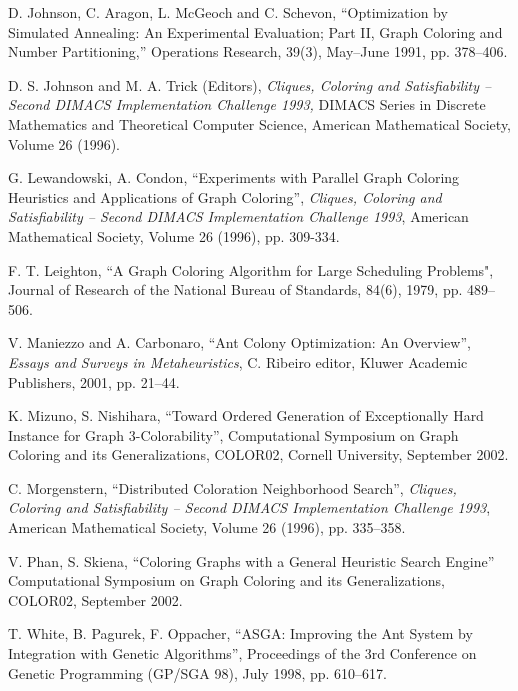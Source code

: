 \documentclass[11pt]{article}
\begin{document}
\begin{thebibliography}{99}
D. Johnson, C. Aragon, L. McGeoch and C. Schevon,
``Optimization by Simulated Annealing: An Experimental Evaluation; Part II,
Graph Coloring and Number Partitioning,''  
Operations Research,  39(3), May--June 1991, pp. 378--406.


D. S. Johnson and M. A. Trick (Editors),
{\it Cliques, Coloring and Satisfiability -- Second DIMACS Implementation
Challenge 1993,}  
DIMACS Series in Discrete Mathematics and Theoretical Computer Science,
American Mathematical Society, Volume 26 (1996).

G. Lewandowski, A. Condon,
``Experiments with Parallel Graph Coloring Heuristics and Applications of
Graph Coloring'',
{\it Cliques, Coloring and Satisfiability -- Second DIMACS Implementation
Challenge 1993}, American Mathematical Society, Volume 26 (1996), pp. 
309-334.

F. T. Leighton,
``A Graph Coloring Algorithm for Large Scheduling Problems",
Journal of Research of the National Bureau of Standards, 84(6), 1979, 
pp. 489--506.

V. Maniezzo and A. Carbonaro,
``Ant Colony Optimization: An Overview'', {\it Essays and Surveys in
Metaheuristics}, C. Ribeiro editor, Kluwer Academic Publishers, 2001, pp.
21--44.


K. Mizuno, S. Nishihara,
``Toward Ordered Generation of Exceptionally Hard Instance for Graph
3-Colorability'',
Computational Symposium on Graph Coloring and its Generalizations, 
COLOR02, Cornell University, September 2002.

C. Morgenstern,
``Distributed Coloration Neighborhood Search'',
{\it Cliques, Coloring and Satisfiability -- Second DIMACS Implementation
Challenge 1993}, American Mathematical Society, Volume 26 (1996), pp. 
335--358.

V. Phan, S. Skiena,
``Coloring Graphs with a General Heuristic Search Engine''
Computational Symposium on Graph Coloring and its Generalizations, 
COLOR02, September 2002.


T. White, B. Pagurek, F. Oppacher,
``ASGA: Improving the Ant System by Integration with Genetic Algorithms'',
Proceedings of the 3rd Conference on Genetic Programming (GP/SGA 98), 
July
1998, pp. 610--617.


\end{thebibliography}



\end{document}
